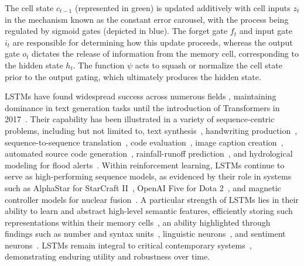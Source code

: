 The cell state $c_{t-1}$ (represented in green) is updated additively with cell inputs $z_t$ in the mechanism known as the constant error carousel, with the process being regulated by sigmoid gates (depicted in blue). The forget gate $f_t$ and input gate $i_t$ are responsible for determining how this update proceeds, whereas the output gate $o_t$ dictates the release of information from the memory cell, corresponding to the hidden state $h_t$. The function $\psi$ acts to squash or normalize the cell state prior to the output gating, which ultimately produces the hidden state.

LSTMs have found widespread success across numerous fields \citep{Hochreiter:01,Hochreiter:07,Schmidhuber:15}, maintaining dominance in text generation tasks until the introduction of Transformers in 2017~\citep{Vaswani:17}. Their capability has been illustrated in a variety of sequence-centric problems, including but not limited to, text synthesis~\citep{Graves:13,Karpathy:15blog}, handwriting production~\citep{Graves:13}, sequence-to-sequence translation~\citep{Sutskever:14nips}, code evaluation~\citep{Zaremba:14arxiv}, image caption creation~\citep{Karpathy:15,Hossain:19}, automated source code generation~\citep{Karpathy:15blog}, rainfall-runoff prediction~\citep{Kratzert:18,Kratzert:19}, and hydrological modeling for flood alerts~\citep{Nearing:24}. Within reinforcement learning, LSTMs continue to serve as high-performing sequence models, as evidenced by their role in systems such as AlphaStar for StarCraft II~\citep{Vinyals:17short}, OpenAI Five for Dota 2~\citep{OpenAI:19}, and magnetic controller models for nuclear fusion~\citep{Degrave:22short}. A particular strength of LSTMs lies in their ability to learn and abstract high-level semantic features, efficiently storing such representations within their memory cells~\citep{Karpathy:15blog}, an ability highlighted through findings such as number and syntax units~\citep{Lakretz:19}, linguistic neurons~\citep{Bau:19}, and sentiment neurons~\citep{Radford:17arxiv}. LSTMs remain integral to critical contemporary systems~\citep{Degrave:22short,Nearing:24}, demonstrating enduring utility and robustness over time.

